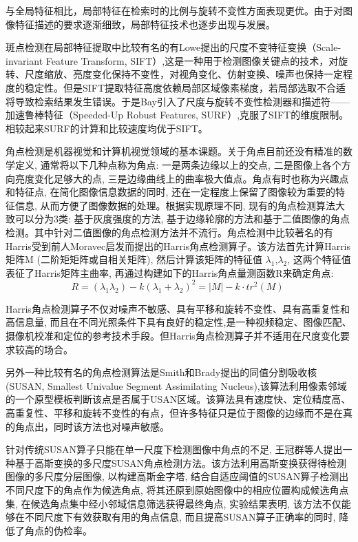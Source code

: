 \documentclass[bachelor_p]{hdu-thesis}
\begin{document}
与全局特征相比，局部特征在检索时的比例与旋转不变性方面表现更优。由于对图像特征描述的要求逐渐细致，局部特征技术也逐步出现与发展。

斑点检测在局部特征提取中比较有名的有Lowe\citep{SIFT}提出的尺度不变特征变换（Scale-invariant Feature Transform, SIFT）,这是一种用于检测图像关键点的技术，对旋转、尺度缩放、亮度变化保持不变性，对视角变化、仿射变换、噪声也保持一定程度的稳定性。但是SIFT提取特征高度依赖局部区域像素梯度，若局部选取不合适将导致检索结果发生错误。于是Bay\citep{SURF}引入了尺度与旋转不变性检测器和描述符——加速鲁棒特征（Speeded-Up Robust Features, SURF）,克服了SIFT的维度限制。相较起来SURF的计算和比较速度均优于SIFT。

角点检测是机器视觉和计算机视觉领域的基本课题。关于角点目前还没有精准的数学定义, 通常将以下几种点称为角点: 一是两条边缘以上的交点, 二是图像上各个方向亮度变化足够大的点, 三是边缘曲线上的曲率极大值点。角点有时也称为兴趣点和特征点, 在简化图像信息数据的同时, 还在一定程度上保留了图像较为重要的特征信息, 从而方便了图像数据的处理。根据实现原理不同, 现有的角点检测算法大致可以分为3类: 基于灰度强度的方法, 基于边缘轮廓的方法和基于二值图像的角点检测。其中针对二值图像的角点检测方法并不流行\citep{CORNER}。角点检测中比较著名的有Harris\citep{HARRIS}受到前人Moravec\citep{MORAVEC}启发而提出的Harris角点检测算子。该方法首先计算Harris矩阵M (二阶矩矩阵或自相关矩阵), 然后计算该矩阵的特征值 $\lambda _1$,$\lambda _2$, 这两个特征值表征了Harris矩阵主曲率, 再通过构建如下的Harris角点量测函数R来确定角点:
\begin{equation}
  R = ({\lambda _1}{\lambda _2}) - k{({\lambda _1} + {\lambda _2})^2} = \left| M \right| - k \cdot t{r^2}(M)\;
\end{equation}

Harris角点检测算子不仅对噪声不敏感、具有平移和旋转不变性、具有高重复性和高信息量, 而且在不同光照条件下具有良好的稳定性,是一种视频稳定、图像匹配、摄像机校准和定位的参考技术手段。但Harris角点检测算子并不适用在尺度变化要求较高的场合\citep{CORNER}。

另外一种比较有名的角点检测算法是Smith和Brady\citep{Smith}提出的同值分割吸收核(SUSAN, Smallest Univalue Segment Assimilating Nucleus),该算法利用像素邻域的一个原型模板判断该点是否属于USAN区域。该算法具有速度快、定位精度高、高重复性、平移和旋转不变性的有点，但许多特征只是位于图像的边缘而不是在真的角点出，同时该方法也对噪声敏感。

针对传统SUSAN算子只能在单一尺度下检测图像中角点的不足, 王冠群\citep{CROWN}等人提出一种基于高斯变换的多尺度SUSAN角点检测方法。该方法利用高斯变换获得待检测图像的多尺度分层图像, 以构建高斯金字塔, 结合自适应阈值的SUSAN算子检测出不同尺度下的角点作为候选角点, 将其还原到原始图像中的相应位置构成候选角点集, 在候选角点集中经小邻域信息筛选获得最终角点, 实验结果表明, 该方法不仅能够在不同尺度下有效获取有用的角点信息, 而且提高SUSAN算子正确率的同时, 降低了角点的伪检率\citep{CORNER}。
\end{document}
